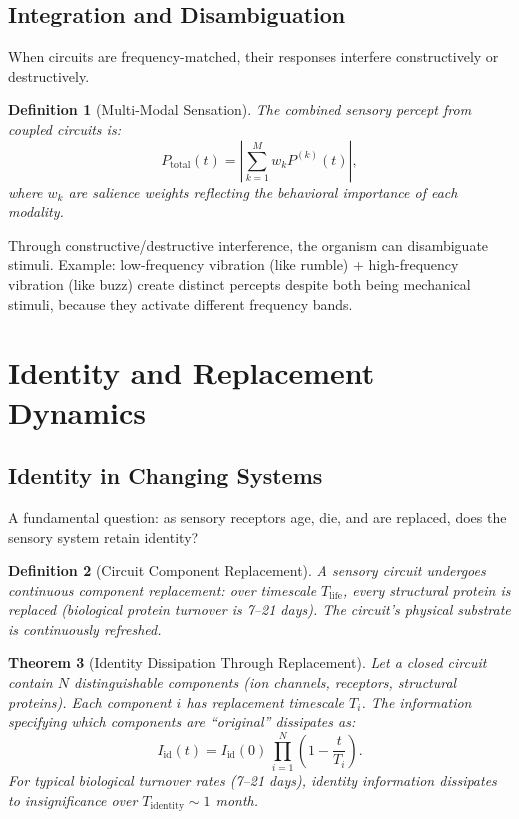 \documentclass[twocolumn,10pt]{article}
\newtheorem{theorem}{Theorem}[section]
\newtheorem{definition}[theorem]{Definition}
\theoremstyle{remark}
\newcommand{\Prate}{P}
\begin{document}
\subsection{Integration and Disambiguation}

When circuits are frequency-matched, their responses interfere constructively or destructively.

\begin{definition}[Multi-Modal Sensation]
\label{def:multimodal}
The combined sensory percept from coupled circuits is:
\begin{equation}
  \Prate_{\mathrm{total}}(t) = \left| \sum_{k=1}^{M} w_k \Prate^{(k)}(t) \right|,
\end{equation}
where $w_k$ are salience weights reflecting the behavioral importance of each modality.
\end{definition}

Through constructive/destructive interference, the organism can disambiguate stimuli. Example: low-frequency vibration (like rumble) + high-frequency vibration (like buzz) create distinct percepts despite both being mechanical stimuli, because they activate different frequency bands.

\section{Identity and Replacement Dynamics}
\label{sec:identity}

\subsection{Identity in Changing Systems}

A fundamental question: as sensory receptors age, die, and are replaced, does the sensory system retain identity?

\begin{definition}[Circuit Component Replacement]
\label{def:replacement}
A sensory circuit undergoes continuous component replacement: over timescale $T_{\mathrm{life}}$, every structural protein is replaced (biological protein turnover is 7--21 days). The circuit's physical substrate is continuously refreshed.
\end{definition}

\begin{theorem}[Identity Dissipation Through Replacement]
\label{thm:identity}
Let a closed circuit contain $N$ distinguishable components (ion channels, receptors, structural proteins). Each component $i$ has replacement timescale $T_i$. The information specifying which components are ``original'' dissipates as:
\begin{equation}
  I_{\mathrm{id}}(t) = I_{\mathrm{id}}(0) \, \prod_{i=1}^{N} \left(1 - \frac{t}{T_i}\right).
\end{equation}
For typical biological turnover rates (7--21 days), identity information dissipates to insignificance over $T_{\mathrm{identity}} \sim 1$ month.
\end{theorem}
\end{document}
